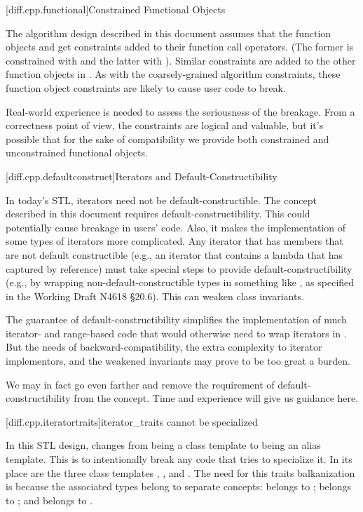 [diff.cpp.functional]{Constrained Functional Objects}

\pnum
The algorithm design described in this document assumes that the function objects
 and  get constraints added to their function call operators.
(The former is constrained with  and the latter with
). Similar constraints are added to the other function objects
in . As with the
coarsely-grained algorithm constraints, these function object constraints are likely to cause
user code to break.

\pnum
Real-world experience is needed to assess the seriousness of the breakage. From a correctness point
of view, the constraints are logical and valuable, but it's possible that for the sake of
compatibility we provide both constrained and unconstrained functional objects.

[diff.cpp.defaultconstruct]{Iterators and Default-Constructibility}

\pnum
In today's STL, iterators need not be default-constructible. The  concept described
in this document requires default-constructibility. This could potentially cause breakage in users'
code. Also, it makes the implementation of some types of iterators more complicated. Any iterator
that has members that are not default constructible (e.g., an iterator that contains a lambda that
has captured by reference) must take special steps to provide default-constructibility (e.g.,
by wrapping non-default-constructible types in something like , as specified
in the  Working Draft N4618 \S20.6). This can weaken class invariants.

\pnum
The guarantee of default-constructibility simplifies the implementation of much iterator- and
range-based code that would otherwise need to wrap iterators in . But the
needs of backward-compatibility, the extra complexity to iterator implementors, and the weakened
invariants may prove to be too great a burden.

\pnum
We may in fact go even farther and remove the requirement of default-constructibility from the
 concept. Time and experience will give us guidance here.

[diff.cpp.iteratortraits]{iterator_traits cannot be specialized}

\pnum
In this STL design,  changes from being a class template to being an
alias template. This is to intentionally break any code that tries to specialize it. In its place
are the three class templates , , and
. The need for this traits balkanization is because the associated types
belong to separate concepts:  belongs to ;
 belongs to ; and  belongs to
.

